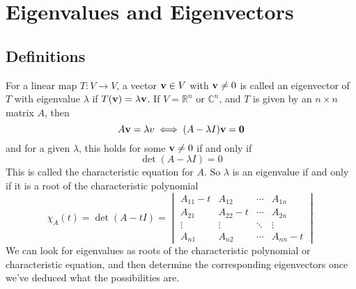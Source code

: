 \documentclass{article}
\begin{document}
\section{Eigenvalues and Eigenvectors}
\subsection{Definitions}
For a linear map $T\colon V \to V$, a vector $\vb v \in V$ with $\vb v \neq 0$ is called an eigenvector of $T$ with eigenvalue $\lambda$ if $T(\vb v) = \lambda \vb v$. If $V = \mathbb R^n$ or $\mathbb C^n$, and $T$ is given by an $n \times n$ matrix $A$, then
\[ A\vb v = \lambda v \iff (A - \lambda I)\vb v = \vb 0 \]
and for a given $\lambda$, this holds for some $\vb v \neq 0$ if and only if
\[ \det(A - \lambda I) = 0 \]
This is called the characteristic equation for $A$. So $\lambda$ is an eigenvalue if and only if it is a root of the characteristic polynomial
\[ \chi_A(t) = \det(A - tI) = \begin{vmatrix}
        A_{11} - t & A_{12}     & \cdots & A_{1n}     \\
        A_{21}     & A_{22} - t & \cdots & A_{2n}     \\
        \vdots     & \vdots     & \ddots & \vdots     \\
        A_{n1}     & A_{n2}     & \cdots & A_{nn} - t
    \end{vmatrix} \]
We can look for eigenvalues as roots of the characteristic polynomial or characteristic equation, and then determine the corresponding eigenvectors once we've deduced what the possibilities are.
\end{document}
